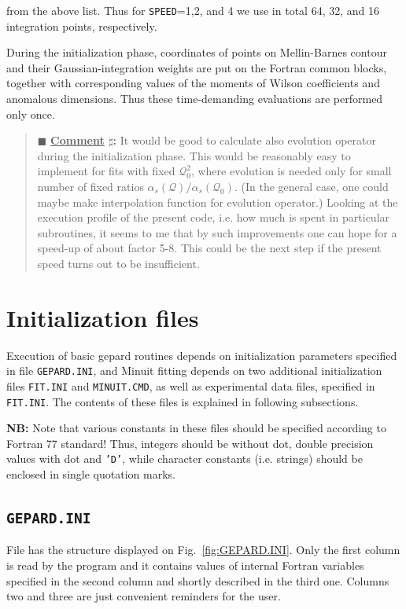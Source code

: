 \documentclass[12pt]{article}
\newcounter{comment}
\newenvironment{commblock}%
{\refstepcounter{comment}%
\begin{quote}\renewcommand{\baselinestretch}{1}
\ttfamily\small$\blacksquare$ \textbf{\underline{Comment} $\sharp$\thecomment:}}%
{\end{quote}}
\begin{document}
from the above list. Thus for \texttt{SPEED}=1,2, and 4 we use in total 64, 32, and 16
integration points, respectively. 

During the initialization phase, coordinates of points on Mellin-Barnes contour and 
their Gaussian-integration weights
are put on the Fortran common blocks, together with corresponding values of
the moments of Wilson coefficients and anomalous dimensions. Thus these
time-demanding evaluations are performed only once.

\begin{commblock}
It would be good to calculate also evolution operator during the initialization phase.
This would be reasonably easy to implement for fits with fixed $\mathcal{Q}_{0}^2$, 
where evolution is needed only for small number of fixed ratios 
$\alpha_{s}(\mathcal{Q})/\alpha_{s}(\mathcal{Q}_0)$. (In the general case, one could
maybe make interpolation function for evolution operator.)
Looking at the execution profile of the present code, i.e. how much is spent
in particular subroutines, it seems to me that by such improvements one can hope
for a speed-up of about factor 5-8. This could be the next step if the present
speed turns out to be insufficient.
\end{commblock}

\section{Initialization files}

Execution of basic gepard routines depends on initialization parameters specified in
file \texttt{GEPARD.INI}, and Minuit fitting depends on two additional initialization files
\texttt{FIT.INI} and \texttt{MINUIT.CMD}, as well as experimental data files, specified
in  \texttt{FIT.INI}. The contents of these files is explained in following subsections.

\textbf{NB:} Note that various constants in these files should be specified
according to Fortran 77 standard! Thus, integers should be without dot, double precision values
with dot and \texttt{'D'}, while character constants (i.e. strings) should be enclosed in
single quotation marks.

\subsection{\texttt{GEPARD.INI}}

File has the structure displayed on Fig.~\ref{fig:GEPARD.INI}.
Only the first column is read by the program and it contains
values of internal Fortran variables specified in the second column and
shortly described in the third one. 
Columns two and three are just convenient reminders for the user. 
\end{document}
